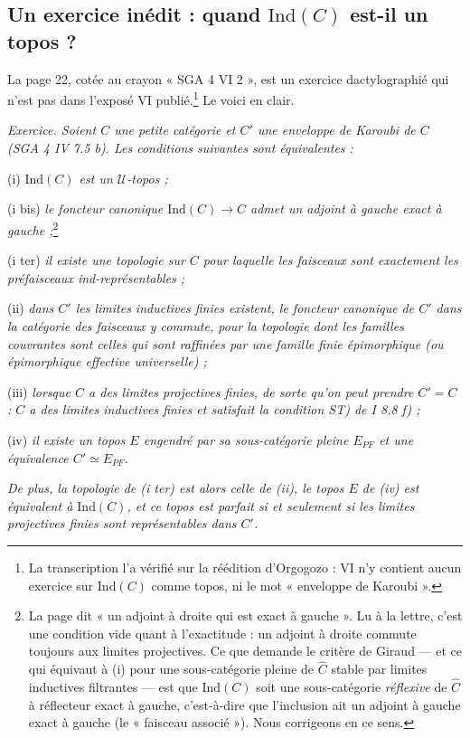 \documentclass[11pt,a4paper]{article}
\begin{document}
\subsection*{Un exercice inédit : quand $\mathrm{Ind}(C)$ est-il un topos ?}

La page 22, cotée au crayon « SGA 4 VI 2 », est un exercice dactylographié qui
n'est pas dans l'exposé VI publié.\footnote{La transcription l'a vérifié sur
la réédition d'Orgogozo : VI n'y contient aucun exercice sur
$\mathrm{Ind}(C)$ comme topos, ni le mot « enveloppe de Karoubi ».}
Le voici en clair.

\emph{Exercice. Soient $C$ une petite catégorie et $C'$ une enveloppe de
Karoubi de $C$ (SGA 4 IV 7.5 b). Les conditions suivantes sont
équivalentes :}

(i) \emph{$\mathrm{Ind}(C)$ est un $\mathcal{U}$-topos ;}

(i bis) \emph{le foncteur canonique $\mathrm{Ind}(C) \to \widehat{C}$ admet un
adjoint à gauche exact à gauche ;}\footnote{La page dit « un adjoint à
droite qui est exact à gauche ». Lu à la lettre, c'est une condition vide
quant à l'exactitude : un adjoint à droite commute toujours aux limites
projectives. Ce que demande le critère de Giraud --- et ce qui équivaut à (i)
pour une sous-catégorie pleine de $\widehat{C}$ stable par limites inductives
filtrantes --- est que $\mathrm{Ind}(C)$ soit une sous-catégorie
\emph{réflexive} de $\widehat{C}$ à réflecteur exact à gauche, c'est-à-dire
que l'inclusion ait un adjoint à gauche exact à gauche (le « faisceau
associé »). Nous corrigeons en ce sens.}

(i ter) \emph{il existe une topologie sur $C$ pour laquelle les faisceaux sont
exactement les préfaisceaux ind-représentables ;}

(ii) \emph{dans $C'$ les limites inductives finies existent, le foncteur
canonique de $C'$ dans la catégorie des faisceaux y commute, pour la
topologie dont les familles couvrantes sont celles qui sont raffinées par une
famille finie épimorphique (ou épimorphique effective universelle) ;}

(iii) \emph{lorsque $C$ a des limites projectives finies, de sorte qu'on peut
prendre $C' = C$ : $C$ a des limites inductives finies et satisfait la
condition ST) de I 8.8 f) ;}

(iv) \emph{il existe un topos $E$ engendré par sa sous-catégorie pleine
$E_{PF}$ et une équivalence $C' \simeq E_{PF}$.}

\emph{De plus, la topologie de (i ter) est alors celle de (ii), le topos $E$
de (iv) est équivalent à $\mathrm{Ind}(C)$, et ce topos est parfait si et
seulement si les limites projectives finies sont représentables dans $C'$.}
\end{document}
